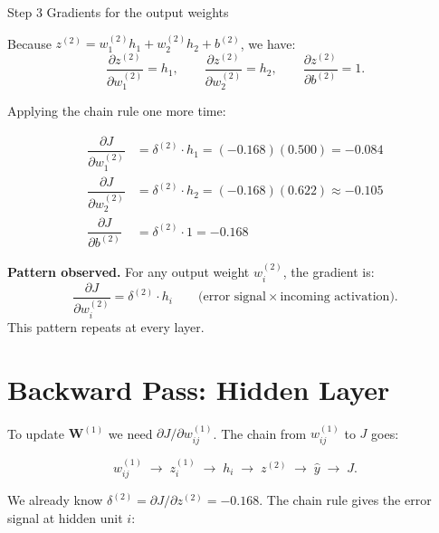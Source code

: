 \documentclass[12pt, a4paper]{article}
\newif\ifstudentmode
\newcommand{\sol}[2][6cm]{%
  \ifstudentmode
    \underline{\hspace{#1}}%
  \else
    {#2}%
  \fi
}
\theoremstyle{definition}
\newcommand{\yhat}{\hat{y}}
\newcommand{\bW}{\mathbf{W}}
\newcommand{\pd}[2]{\dfrac{\partial #1}{\partial #2}}
\begin{document}
\begin{stepbox}{Step 3 \quad Gradients for the output weights}

Because $z^{(2)} = w^{(2)}_1 h_1 + w^{(2)}_2 h_2 + b^{(2)}$, we have:
\[
  \pd{z^{(2)}}{w^{(2)}_1} = h_1, \qquad
  \pd{z^{(2)}}{w^{(2)}_2} = h_2, \qquad
  \pd{z^{(2)}}{b^{(2)}} = 1.
\]

Applying the chain rule one more time:

\begin{align*}
  \pd{J}{w^{(2)}_1}
    &= \delta^{(2)} \cdot h_1
     = (-0.168)(0.500)
     = \sol[3cm]{-0.084} \\[6pt]
  \pd{J}{w^{(2)}_2}
    &= \delta^{(2)} \cdot h_2
     = (-0.168)(0.622)
     \approx \sol[3cm]{-0.105} \\[6pt]
  \pd{J}{b^{(2)}}
    &= \delta^{(2)} \cdot 1
     = \sol[3cm]{-0.168}
\end{align*}
\end{stepbox}

\vspace{0.5em}

\begin{notebox}
\textbf{Pattern observed.}
For any output weight $w^{(2)}_i$, the gradient is:
\[
  \pd{J}{w^{(2)}_i} = \delta^{(2)} \cdot h_i
  \qquad \text{(error signal} \times \text{incoming activation)}.
\]
This pattern repeats at every layer.
\end{notebox}

\section{Backward Pass: Hidden Layer}

To update $\bW^{(1)}$ we need $\partial J / \partial w^{(1)}_{ij}$.
The chain from $w^{(1)}_{ij}$ to $J$ goes:

\[
  w^{(1)}_{ij}
  \;\to\; z^{(1)}_i
  \;\to\; h_i
  \;\to\; z^{(2)}
  \;\to\; \yhat
  \;\to\; J.
\]

We already know $\delta^{(2)} = \partial J / \partial z^{(2)} = -0.168$.
The chain rule gives the error signal at hidden unit $i$:
\end{document}
